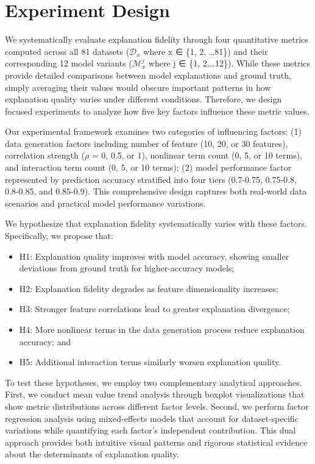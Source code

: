 \documentclass{article}
\begin{document}
\section{Experiment Design}

We systematically evaluate explanation fidelity through four quantitative metrics computed across all 81 datasets ($\mathcal{D}_{x}$ where x ∈ \{1, 2, \ldots81\}) and their corresponding 12 model variants ($\mathcal{M}_{x}^{j}$ where j ∈ \{1, 2,\ldots12\}). While these metrics provide detailed comparisons between model explanations and ground truth, simply averaging their values would obscure important patterns in how explanation quality varies under different conditions. Therefore, we design focused experiments to analyze how five key factors influence these metric values.

Our experimental framework examines two categories of influencing factors: (1) data generation factors including number of feature (10, 20, or 30 features), correlation strength ($\rho$ = 0, 0.5, or 1), nonlinear term count (0, 5, or 10 terms), and interaction term count (0, 5, or 10 terms); (2) model performance factor represented by prediction accuracy stratified into four tiers (0.7-0.75, 0.75-0.8, 0.8-0.85, and 0.85-0.9). This comprehensive design captures both real-world data scenarios and practical model performance variations.

We hypothesize that explanation fidelity systematically varies with these factors. Specifically, we propose that:

\begin{itemize}
    \item H1: Explanation quality improves with model accuracy, showing smaller deviations from ground truth for higher-accuracy models;
    \item H2: Explanation fidelity degrades as feature dimensionality increases;
    \item H3: Stronger feature correlations lead to greater explanation divergence;
    \item H4: More nonlinear terms in the data generation process reduce explanation accuracy; and
    \item H5: Additional interaction terms similarly worsen explanation quality.
\end{itemize}

To test these hypotheses, we employ two complementary analytical approaches. First, we conduct mean value trend analysis through boxplot visualizations that show metric distributions across different factor levels. Second, we perform factor regression analysis using mixed-effects models that account for dataset-specific variations while quantifying each factor's independent contribution. This dual approach provides both intuitive visual patterns and rigorous statistical evidence about the determinants of explanation quality.
\end{document}

